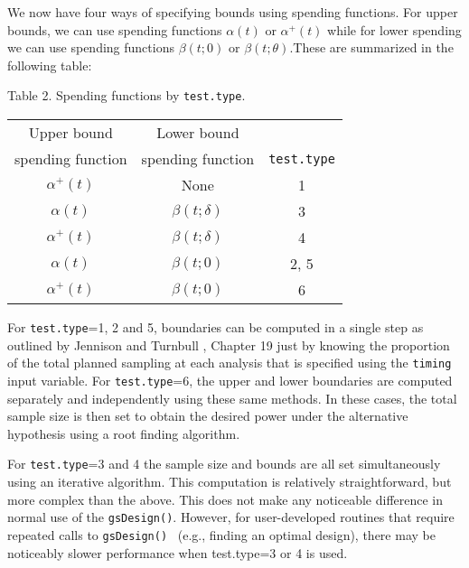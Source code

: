 We now have four ways of specifying bounds using spending functions. For upper
bounds, we can use spending functions $\alpha(t)$ or $\alpha^{+}(t)$ while for
lower spending we can use spending functions $\beta(t;0)$ or $\beta
(t;\theta).$These are summarized in the following table:

\begin{center}
\bigskip Table 2. Spending functions by \texttt{test.type}.

\bigskip%

\begin{tabular}
[c]{ccc}%
Upper bound & Lower bound & \\
spending function & spending function & \texttt{test.type}\\\hline
$\alpha^{+}(t)$ & None & 1\\
$\alpha(t)$ & $\beta(t;\delta)$ & 3\\
$\alpha^{+}(t)$ & $\beta(t;\delta)$ & 4\\
$\alpha(t)$ & $\beta(t;0)$ & 2, 5\\
$\alpha^{+}(t)$ & $\beta(t;0)$ & 6
\end{tabular}


\bigskip
\end{center}

For \texttt{test.type}=1, 2 and 5, boundaries can be computed in a single step
as outlined by Jennison and Turnbull \cite{JTBook}, Chapter 19 just by knowing
the proportion of the total planned sampling at each analysis that is
specified using the \texttt{timing} input variable. For \texttt{test.type}=6,
the upper and lower boundaries are computed separately and independently using
these same methods. In these cases, the total sample size is then set to
obtain the desired power under the alternative hypothesis using a root finding algorithm.

For \texttt{test.type}=3 and 4 the sample size and bounds are all set
simultaneously using an iterative algorithm. This computation is relatively
straightforward, but more complex than the above. This does not make any
noticeable difference in normal use of the \texttt{gsDesign()}. However, for
user-developed routines that require repeated calls to \texttt{gsDesign()}%
\ (e.g., finding an optimal design), there may be noticeably slower
performance when test.type=3 or 4 is used.

